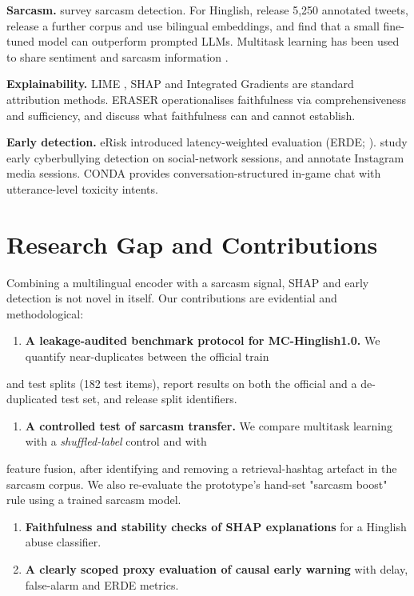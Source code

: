 \documentclass[10pt,twocolumn]{article}
\begin{document}
\textbf{Sarcasm.} \citet{joshi2017sarcasm} survey sarcasm detection. For Hinglish, \citet{swami2018sarcasm} release 5,250
annotated tweets, \citet{aggarwal2020sarcasm} release a further corpus and use bilingual embeddings, and
\citet{majumder2026smallwins} find that a small fine-tuned model can outperform prompted LLMs. Multitask learning
\cite{caruana1997multitask,ruder2017mtl} has been used to share sentiment and sarcasm information
\cite{majumder2019sarcasmmtl}.

\textbf{Explainability.} LIME \cite{ribeiro2016lime}, SHAP \cite{lundberg2017shap} and Integrated Gradients
\cite{sundararajan2017ig} are standard attribution methods. ERASER \cite{deyoung2020eraser} operationalises
faithfulness via comprehensiveness and sufficiency, and \citet{jacovi2020faithfulness} discuss what faithfulness can
and cannot establish.

\textbf{Early detection.} eRisk introduced latency-weighted evaluation (ERDE; \citealp{losada2016erisk}).
\citet{lopezvizcaino2021early} study early cyberbullying detection on social-network sessions, and
\citet{hosseinmardi2015instagram} annotate Instagram media sessions. CONDA \cite{weld2021conda} provides
conversation-structured in-game chat with utterance-level toxicity intents.

\section{Research Gap and Contributions}

Combining a multilingual encoder with a sarcasm signal, SHAP and early detection is not novel in itself. Our
contributions are evidential and methodological:

\begin{enumerate}
\item \textbf{A leakage-audited benchmark protocol for MC-Hinglish1.0.} We quantify near-duplicates between the official train
\end{enumerate}
   and test splits (182 test items), report results on both the official and a de-duplicated test
   set, and release split identifiers.
\begin{enumerate}
\item \textbf{A controlled test of sarcasm transfer.} We compare multitask learning with a \emph{shuffled-label} control and with
\end{enumerate}
   feature fusion, after identifying and removing a retrieval-hashtag artefact in the sarcasm corpus. We also re-evaluate
   the prototype's hand-set "sarcasm boost" rule using a trained sarcasm model.
\begin{enumerate}
\item \textbf{Faithfulness and stability checks of SHAP explanations} for a Hinglish abuse classifier.
\item \textbf{A clearly scoped proxy evaluation of causal early warning} with delay, false-alarm and ERDE metrics.
\end{enumerate}
\end{document}
